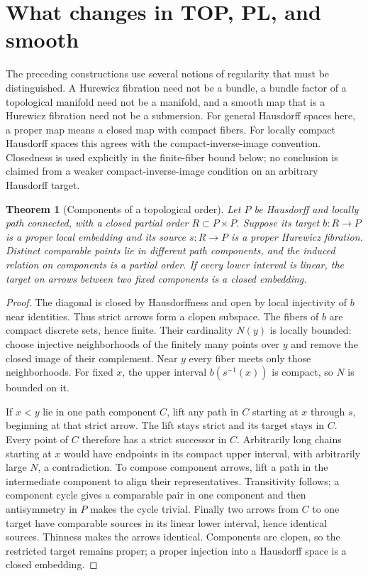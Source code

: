 \documentclass[11pt,a4paper]{article}
\newtheorem{theorem}{Theorem}[section]
\theoremstyle{definition}
\begin{document}
\section{What changes in TOP, PL, and smooth}\label{sec:categories}
The preceding constructions use several notions of regularity that
must be distinguished. A Hurewicz fibration need not be a bundle, a
bundle factor of a topological manifold need not be a manifold, and a
smooth map that is a Hurewicz fibration need not be a submersion.
For general Hausdorff spaces here, a proper map means a closed map
with compact fibers. For locally compact Hausdorff spaces this agrees
with the compact-inverse-image convention. Closedness is used explicitly
in the finite-fiber bound below; no conclusion is claimed from a weaker
compact-inverse-image condition on an arbitrary Hausdorff target.

\begin{theorem}[Components of a topological order]\label{thm:components}
Let $P$ be Hausdorff and locally path connected, with a closed partial
order $R\subset P\times P$. Suppose its target $b:R\to P$ is a proper
local embedding and its source $s:R\to P$ is a proper Hurewicz fibration.
Distinct comparable points lie in different path components, and the
induced relation on components is a partial order. If every lower
interval is linear, the target on arrows between two fixed components
is a closed embedding.
\end{theorem}
\begin{proof}
The diagonal is closed by Hausdorffness and open by local injectivity
of $b$ near identities. Thus strict arrows form a clopen subspace.
The fibers of $b$ are compact discrete sets, hence finite. Their
cardinality $N(y)$ is locally bounded: choose injective neighborhoods
of the finitely many points over $y$ and remove the closed image of
their complement. Near $y$ every fiber meets only those neighborhoods.
For fixed $x$, the upper interval $b(s^{-1}(x))$ is compact, so $N$ is
bounded on it.

If $x<y$ lie in one path component $C$, lift any path in $C$ starting
at $x$ through $s$, beginning at that strict arrow. The lift stays
strict and its target stays in $C$. Every point of $C$ therefore has
a strict successor in $C$. Arbitrarily long chains starting at $x$
would have endpoints in its compact upper interval, with arbitrarily
large $N$, a contradiction. To compose component arrows, lift a path
in the intermediate component to align their representatives.
Transitivity follows; a component cycle gives a comparable pair in
one component and then antisymmetry in $P$ makes the cycle trivial.
Finally two arrows from $C$ to one target have comparable sources in
its linear lower interval, hence identical sources. Thinness makes
the arrows identical. Components are clopen, so the restricted target
remains proper; a proper injection into a Hausdorff space is a closed
embedding.
\end{proof}
\end{document}
